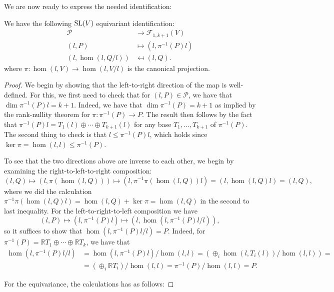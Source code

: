 \documentclass{report}
\begin{document}
We are now ready to express the needed identification:
\begin{proposition}\label{prop:grassmanian_tangent_flags}
We have the following $\operatorname{{\mathrm{SL}}}(V)$ equivariant identification:
\begin{align*}
    \mathcal P &\to \mathcal F_{1, k+1}(V)\\
    (l, P) &\mapsto (l, \pi^{-1}(P)l)\\
    (l, \hom(l, Q/l)) &\mapsfrom (l, Q).
\end{align*}
where $\pi : \hom(l, V) \to \hom(l, V/l)$ is the canonical projection.
\end{proposition}
\begin{proof}
    We begin by showing that the left-to-right direction of the map is well-defined.
    For this, we first need to check that for $(l,P) \in \mathcal P$, we have that $\dim \pi^{-1}(P)l = k + 1$.
    Indeed, we have that $\dim \pi^{-1}(P) = k+1$ as implied by the rank-nullity theorem for $\pi: \pi^{-1}(P) \to P$.
    The result then follows by the fact that $\pi^{-1}(P)l = T_1(l) \oplus \cdots \oplus T_{k+1}(l)$ for any base $T_1, \ldots, T_{k+1}$ of $\pi^{-1}(P)$.
    The second thing to check is that $ l \leq \pi^{-1}(P)l$, which holds since $\ker \pi = \hom(l,l) \leq \pi^{-1}(P)$.

    To see that the two directions above are inverse to each other, we begin by examining the right-to-left-to-right composition:
    \[
    (l, Q) \mapsto (l, \pi(\hom(l, Q))) \mapsto (l, \pi^{-1}\pi(\hom(l, Q))l) = (l, \hom(l, Q)l) = (l, Q),
    \]
    where we did the calculation $\pi^{-1}\pi(\hom(l, Q)l) =  \hom(l,Q) + \ker \pi = \hom(l,Q)$ in the second to last inequality. 
    For the left-to-right-to-left composition we have
    \[
        (l, P) \mapsto (l, \pi^{-1}(P)l) \mapsto (l, \hom(l, \pi^{-1}(P)l/l)),
    \]
    so it suffices to show that $\hom(l, \pi^{-1}(P)l/l) = P$.
    Indeed, for $\pi^{-1}(P) = \mathbb R T_1 \oplus \cdots \oplus \mathbb R T_k$, we have that
    \begin{align*}
        \hom(l, \pi^{-1}(P)l/l) &=
        \hom(l, \pi^{-1}(P)l)/\hom(l,l) =
        \left( \oplus_i \hom(l, T_i(l))/\hom(l,l)\right) =\\
        &= \left(\oplus_i \mathbb R T_i\right)/\hom(l,l) 
        = \pi^{-1}(P)/\hom(l,l) = P.
    \end{align*}

    For the equivariance, the calculations has as follows:

\end{proof}
\end{document}
